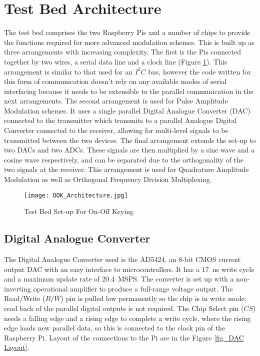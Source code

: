 \documentclass[../main.tex]{subfiles}
\begin{document}
	
\section{Test Bed Architecture}

The test bed comprises the two Raspberry Pis and a number of chips to provide the functions required for more advanced modulation schemes.
This is built up as three arrangements with increasing complexity.
The first is the Pis connected together by two wires, a serial data line and a clock line (Figure \ref{fig_OOK Architecture}).
This arrangement is similar to that used for an $I^2C$ bus, however the code written for this form of communication doesn't rely on any available modes of serial interfacing because it needs to be extensible to the parallel communication in the next arrangements.
The second arrangement is used for Pulse Amplitude Modulation schemes.
It uses a single parallel Digital Analogue Converter (DAC) connected to the transmitter which transmits to a parallel Analogue Digital Converter connected to the receiver, allowing for multi-level signals to be transmitted between the two devices.
The final arrangement extends the set-up to two DACs and two ADCs.
These signals are then multiplied by a sine wave and a cosine wave respectively, and can be separated due to the orthogonality of the two signals at the receiver.
This arrangement is used for Quadrature Amplitude Modulation as well as Orthogonal Frequency Division Multiplexing.\\

\begin{figure}[ht]
	\centering
	\texttt{[image: OOK\_Architecture.jpg]}
	\caption{Test Bed Set-up For On-Off Keying}
	\label{fig_OOK Architecture}
\end{figure}

\subsection{Digital Analogue Converter}

The Digital Analogue Converter used is the AD5424, an 8-bit CMOS current output DAC with an easy interface to microcontrollers.
It has a \SI{17}{\nano\second} write cycle and a maximum update rate of \SI{20.4}{MSPS}. %
The converter is set up with a non-inverting operational amplifier to produce a full-range voltage output.
The Read/Write ($R/\overline{W}$) pin is pulled low permanently so the chip is in write mode; read back of the parallel digital outputs is not required.
The Chip Select pin ($\overline{CS}$) needs a falling edge and a rising edge to complete a write cycle, where the rising edge loads new parallel data, so this is connected to the clock pin of the Raspberry Pi.
Layout of the connections to the Pi are in the Figure \ref{fig_DAC Layout}.\\
\end{document}
